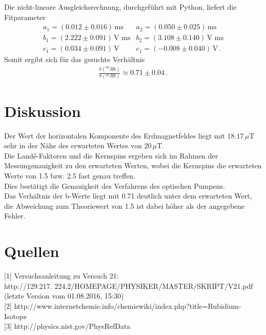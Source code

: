 \documentclass[]{scrartcl}
\begin{document}
Die nicht-lineare Ausgleichsrechnung, durchgeführt mit Python, liefert die Fitparameter
\begin{align*}
a_1=(0.012 \pm 0.016)\,\text{ms} & a_2=(0.050 \pm 0.025)\,\text{ms} \\
b_1=(2.222 \pm 0.091)\, \text{V ms} & b_2=(3.108 \pm 0.140)\, \text{V ms} \\
c_1=(0.034 \pm 0.091)\, \text{V} & c_1=(-0.008 \pm 0.040)\, \text{V}\,.
\end{align*}
Somit ergibt sich für das gesuchte Verhältnis
\begin{align*}
\frac{b(^{87}Rb)}{b(^{85}Rb)}\approx 0.71 \pm 0.04\,.
\end{align*}
\section{Diskussion}
Der Wert der horizontalen Komponente des Erdmagnetfeldes liegt mit $18.17\,\mu$T sehr in der Nähe des erwarteten Wertes von 20$\,\mu$T. \\
Die Landé-Faktoren und die Kernspins ergeben sich im Rahmen der Messungenauigkeit zu den erwarteten Werten, wobei die Kernspins die erwarteten Werte von 1.5 bzw. 2.5 fast genau treffen. \\
Dies bestätigt die Genauigkeit des Verfahrens des optischen Pumpens. \\
Das Verhältnis der b-Werte liegt mit 0.71 deutlich unter dem erwarteten Wert, die Abweichung zum Theoriewert von 1.5 ist dabei höher als der angegebene Fehler.

\section{Quellen}
{[1]} Versuchsanleitung zu Versuch 21: \\
http://129.217.
224.2/HOMEPAGE/PHYSIKER/MASTER/SKRIPT/V21.pdf (letzte Version vom 01.08.2016, 15:30)\\
{[2]} http://www.internetchemie.info/chemiewiki/index.php?title=Rubidium-Isotope \\
{[3]} http://physics.nist.gov/PhysRefData
\end{document}
